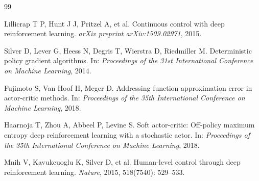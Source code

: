 \documentclass[UTF8,a4paper,12pt]{ctexart}
\begin{document}
\begin{thebibliography}{99}

Lillicrap T P, Hunt J J, Pritzel A, et al.
\newblock Continuous control with deep reinforcement learning.
\newblock \emph{arXiv preprint arXiv:1509.02971}, 2015.

Silver D, Lever G, Heess N, Degris T, Wierstra D, Riedmiller M.
\newblock Deterministic policy gradient algorithms.
\newblock In: \emph{Proceedings of the 31st International Conference on Machine Learning}, 2014.

Fujimoto S, Van Hoof H, Meger D.
\newblock Addressing function approximation error in actor-critic methods.
\newblock In: \emph{Proceedings of the 35th International Conference on Machine Learning}, 2018.

Haarnoja T, Zhou A, Abbeel P, Levine S.
\newblock Soft actor-critic: Off-policy maximum entropy deep reinforcement learning with a stochastic actor.
\newblock In: \emph{Proceedings of the 35th International Conference on Machine Learning}, 2018.

Mnih V, Kavukcuoglu K, Silver D, et al.
\newblock Human-level control through deep reinforcement learning.
\newblock \emph{Nature}, 2015, 518(7540): 529--533.

\end{thebibliography}
\end{document}
